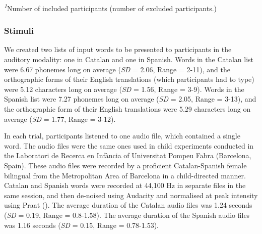 \documentclass[
]{article}
\begin{document}
\begin{minipage}{\linewidth}
\textsuperscript{\textit{1}}Number of included participants (number of excluded participants.)\\
\end{minipage}

\subsubsection{Stimuli}\label{stimuli}

We created two lists of input words to be presented to participants in
the auditory modality: one in Catalan and one in Spanish. Words in the
Catalan list were 6.67 phonemes long on average (\emph{SD} = 2.06, Range
= 2-11), and the orthographic forms of their English translations (which
participants had to type) were 5.12 characters long on average
(\emph{SD} = 1.56, Range = 3-9). Words in the Spanish list were 7.27
phonemes long on average (\emph{SD} = 2.05, Range = 3-13), and the
orthographic form of their English translations were 5.29 characters
long on average (\emph{SD} = 1.77, Range = 3-12).

In each trial, participants listened to one audio file, which contained
a single word. The audio files were the same ones used in child
experiments conducted in the Laboratori de Recerca en Infància of
Universitat Pompeu Fabra (Barcelona, Spain). These audio files were
recorded by a proficient Catalan-Spanish female bilingual from the
Metropolitan Area of Barcelona in a child-directed manner. Catalan and
Spanish words were recorded at 44,100 Hz in separate files in the same
session, and then de-noised using Audacity and normalised at peak
intensity using Praat (). The average duration of the Catalan audio files was
1.24 seconds (\emph{SD} = 0.19, Range = 0.8-1.58). The average duration
of the Spanish audio files was 1.16 seconds (\emph{SD} = 0.15, Range =
0.78-1.53).
\end{document}
